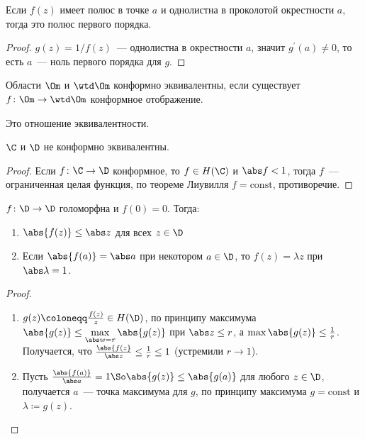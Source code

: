 \begin{consequence}
    Если $f(z)$ имеет полюс в точке $a$ и однолистна
    в проколотой окрестности $a$, тогда это полюс первого порядка.
\end{consequence}

\begin{proof}
    $g(z) = 1/f(z)$~--- однолистна в окрестности
    $a$, значит $g^\prime(a) \ne 0$, то есть $a$~--- ноль первого порядка
    для $g$.
\end{proof}


\begin{definition}
    Области $\Om$ и $\wtd\Om$ конформно эквивалентны,
    если существует $f\colon\Om \to \wtd\Om$ конформное отображение.
\end{definition}

\begin{observation}
    Это отношение эквивалентности.
\end{observation}

\begin{theorem}
    $\C$ и $\D$ не конформно эквивалентны.
\end{theorem}

\begin{proof}
    Если $f\colon \C \to \D$ конформное, то $f \in H(\C)$ и $\abs f < 1$,
    тогда $f$~--- ограниченная целая функция, по теореме Лиувилля
    $f = \mathrm{const}$, противоречие.
\end{proof}

\begin{lemma}[Шварц]
    $f\colon \D \to \D$ голоморфна и $f(0) = 0$.
    Тогда:

    \begin{enumerate}
        \item $\abs{f(z)} \le \abs z$ для всех $z \in \D$
        \item Если $\abs{f(a)} = \abs a$ при некотором $a \in \D$, то
              $f(z) = \lambda z$ при $\abs \lambda = 1$.
    \end{enumerate}
\end{lemma}

\begin{proof}\text{}

    \begin{enumerate}
        \item $g(z) \coloneqq \frac{f(z)}{z} \in H(\D)$,
              по принципу максимума $\abs{g(z)} \le \max\limits_{\abs w = r} \abs{g(z)}$
              при $\abs z \le r$, а $\max \abs{g(z)} \le \frac{1}{r}$.
              Получается, что $\frac{\abs{f(z}}{\abs z} \le \frac{1}{r} \le 1$
              (устремили $r \to 1$).

        \item Пусть $\frac{\abs{f(a)}}{\abs a} = 1 \So \abs{g(z)} \le \abs{g(a)}$
              для любого $z \in \D$, получается $a$~--- точка максимума для $g$,
              по принципу максимума $g = \mathrm{const}$ и $\lambda \coloneqq g(z)$.
    \end{enumerate}
\end{proof}

